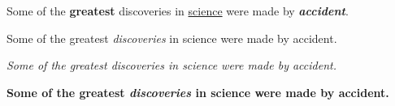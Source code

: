 \documentclass[12pt, letterpaper]{article}
\begin{document}
Some of the \textbf{greatest}
discoveries in \underline{science} 
were made by \textbf{\textit{accident}}.

Some of the greatest \emph{discoveries} in science 
were made by accident.

\textit{Some of the greatest \emph{discoveries} 
in science were made by accident.}

\textbf{Some of the greatest \emph{discoveries} 
in science were made by accident.}
\end{document}
